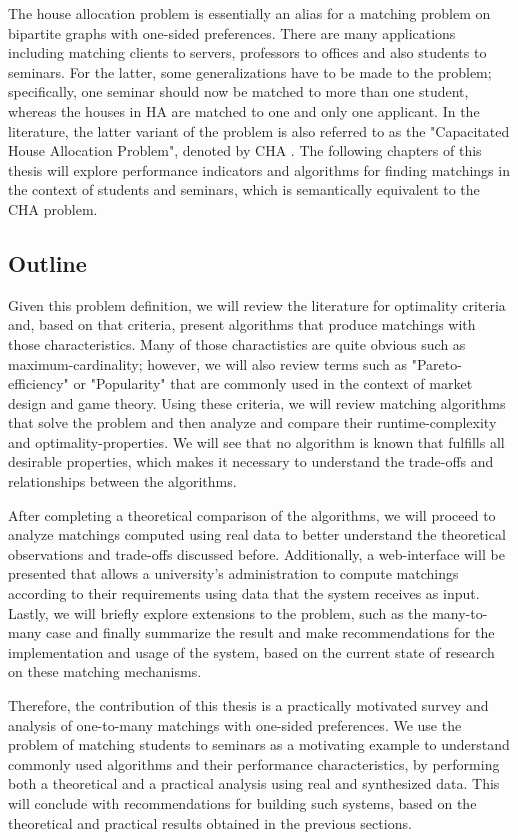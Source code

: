 The house allocation problem is essentially an alias for a matching problem on bipartite graphs with one-sided preferences. There are many applications including matching clients to servers, professors to offices and also students to seminars. For the latter, some generalizations have to be made to the problem; specifically, one seminar should now be matched to more than one student, whereas the houses in HA are matched to one and only one applicant. In the literature, the latter variant of the problem is also referred to as the "Capacitated House Allocation Problem", denoted by CHA \cite{algorithmics}. The following chapters of this thesis will explore performance indicators and algorithms for finding matchings in the context of students and seminars, which is semantically equivalent to the CHA problem.

\subsection{Outline}
Given this problem definition, we will review the literature for optimality criteria and, based on that criteria, present algorithms that produce matchings with those characteristics. Many of those charactistics are quite obvious such as maximum-cardinality; however, we will also review terms such as "Pareto-efficiency" or "Popularity" that are commonly used in the context of market design and game theory. 
Using these criteria, we will review matching algorithms that solve the problem and then analyze and compare their runtime-complexity and optimality-properties. We will see that no algorithm is known that fulfills all desirable properties, which makes it necessary to understand the trade-offs and relationships between the algorithms. 

After completing a theoretical comparison of the algorithms, we will proceed to analyze matchings computed using real data to better understand the theoretical observations and trade-offs discussed before. Additionally, a web-interface will be presented that allows a university's administration to compute matchings according to their requirements using data that the system receives as input. Lastly, we will briefly explore extensions to the problem, such as the many-to-many case and finally summarize the result and make recommendations for the implementation and usage of the system, based on the current state of research on these matching mechanisms.

Therefore, the contribution of this thesis is a practically motivated survey and analysis of one-to-many matchings with one-sided preferences. We use the problem of matching students to seminars as a motivating example to understand commonly used algorithms and their performance characteristics, by performing both a theoretical and a practical analysis using real and synthesized data. This will conclude with recommendations for building such systems, based on the theoretical and practical results obtained in the previous sections. 

